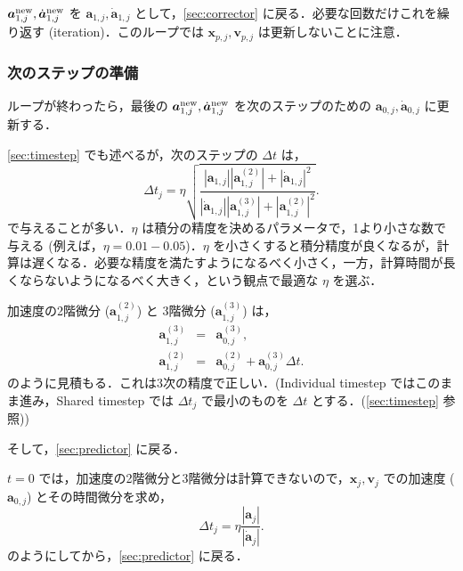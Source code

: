 \documentclass[11pt,a4paper,oneside,onecolumn]{jarticle}
\begin{document}
${\bm a}_{1,j}^{\rm new}, \dot{{\bm a}}_{1,j}^{\rm new}$ を ${\bm a}_{1,j}, \dot{{\bm a}}_{1,j}$ として，\ref{sec:corrector} に戻る．必要な回数だけこれを繰り返す (iteration)．このループでは ${\bm x}_{p,j}, {\bm v}_{p,j}$ は更新しないことに注意．

\subsubsection{次のステップの準備}
ループが終わったら，最後の ${\bm a}_{1,j}^{\rm new}, \dot{{\bm a}}_{1,j}^{\rm new}$ を次のステップのための ${\bm a}_{0,j}, \dot{{\bm a}}_{0,j}$ に更新する．

\ref{sec:timestep} でも述べるが，次のステップの $\Delta t$ は，
\begin{equation}
\Delta t_j = \eta \sqrt{\frac{| {\bm a}_{1,j} | | {\bm a}_{1,j}^{(2)} | + | \dot{{\bm a}}_{1,j} | ^2}{| \dot{{\bm a}}_{1,j} | | {\bm a}_{1,j}^{(3)} | + | {\bm a}_{1,j}^{(2)} | ^2}}.
\end{equation}
で与えることが多い．$\eta$ は積分の精度を決めるパラメータで，1より小さな数で与える (例えば，$\eta = 0.01 - 0.05$)．$\eta$ を小さくすると積分精度が良くなるが，計算は遅くなる．必要な精度を満たすようになるべく小さく，一方，計算時間が長くならないようになるべく大きく，という観点で最適な $\eta$ を選ぶ．

加速度の2階微分 (${\bm a}_{1,j}^{(2)}$) と 3階微分 (${\bm a}_{1,j}^{(3)}$) は，
\begin{eqnarray}
{\bm a}_{1,j}^{(3)} & = & {\bm a}_{0,j}^{(3)}, \\
{\bm a}_{1,j}^{(2)} & = & {\bm a}_{0,j}^{(2)} + {\bm a}_{0,j}^{(3)} \Delta t. 
\end{eqnarray}
のように見積もる．これは3次の精度で正しい．(Individual timestep ではこのまま進み，Shared timestep では $\Delta t_j$ で最小のものを $\Delta t$ とする．(\ref{sec:timestep} 参照))

そして，\ref{sec:predictor} に戻る．

$t = 0$ では，加速度の2階微分と3階微分は計算できないので，${\bm x}_j,{\bm v}_j$ での加速度 (${\bm a}_{0,j}$) とその時間微分を求め，
\begin{equation}
\Delta t_j = \eta \frac{|{\bm a}_j|}{|\dot{{\bm a}}_j|}.
\end{equation}
のようにしてから，\ref{sec:predictor} に戻る．
\end{document}
